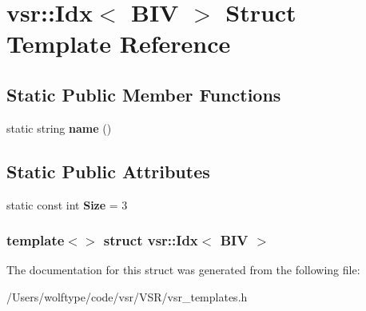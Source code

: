 \hypertarget{structvsr_1_1_idx_3_01_b_i_v_01_4}{\section{vsr\-:\-:Idx$<$ B\-I\-V $>$ Struct Template Reference}
\label{structvsr_1_1_idx_3_01_b_i_v_01_4}
}
\subsection*{Static Public Member Functions}
\begin{DoxyCompactItemize}
\item 
\hypertarget{structvsr_1_1_idx_3_01_b_i_v_01_4_a456a90e2c2017c633bb2f2f66f45d0fa}{static string {\bfseries name} ()}\label{structvsr_1_1_idx_3_01_b_i_v_01_4_a456a90e2c2017c633bb2f2f66f45d0fa}

\end{DoxyCompactItemize}
\subsection*{Static Public Attributes}
\begin{DoxyCompactItemize}
\item 
\hypertarget{structvsr_1_1_idx_3_01_b_i_v_01_4_a1a2513e930bf26eebe5bf9229733fa74}{static const int {\bfseries Size} = 3}\label{structvsr_1_1_idx_3_01_b_i_v_01_4_a1a2513e930bf26eebe5bf9229733fa74}

\end{DoxyCompactItemize}
\subsubsection*{template$<$$>$ struct vsr\-::\-Idx$<$ B\-I\-V $>$}



The documentation for this struct was generated from the following file\-:\begin{DoxyCompactItemize}
\item 
/\-Users/wolftype/code/vsr/\-V\-S\-R/vsr\-\_\-templates.\-h\end{DoxyCompactItemize}

